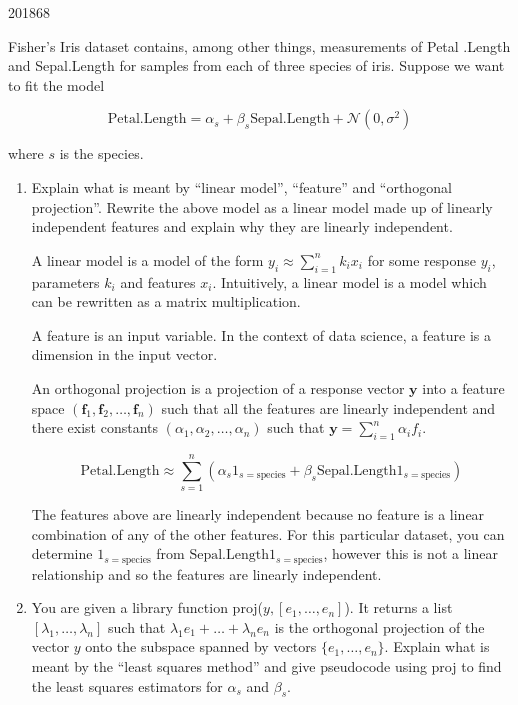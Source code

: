 \documentclass[10pt,\jkfside,a4paper]{article}
\begin{document}
\begin{examquestion}{2018}{6}{8}

Fisher's Iris dataset contains, among other things, measurements of Petal
.Length and Sepal.Length for samples from each of three species of iris.
Suppose we want to fit the model

\[
\text{Petal.Length} = \alpha_s + \beta_s \text{Sepal.Length} + \mathcal{N}
(0, \sigma^2)
\]

where $s$ is the species.

\begin{enumerate}[label=(\alph*)]

\item Explain what is meant by ``linear model'', ``feature'' and
``orthogonal projection''. Rewrite the above model as a linear model made up
of linearly independent features and explain why they are linearly
independent.

A linear model is a model of the form $y_i \approx \sum^{n}_{i=1} k_i x_i $
for some response $y_i$, parameters $k_i$ and features $x_i$. Intuitively, a
linear model is a model which can be rewritten as a matrix multiplication.

A feature is an input variable. In the context of data science, a feature is
a dimension in the input vector.

An orthogonal projection is a projection of a response vector $\mathbf{y}$
into a feature space $(\mathbf{f}_1, \mathbf{f}_2, \dots, \mathbf{f}_n)$
such that all the features are linearly independent and there exist
constants $(\alpha_1, \alpha_2, \dots, \alpha_n)$ such that $\mathbf{y} =
\sum^n_{i=1} \alpha_i f_i$.

\[
\text{Petal.Length} \approx \sum^n_{s=1} \left(\alpha_s 1_{s=\text{species}} +
\beta_s
\text{Sepal.Length} 1_{s=\text{species}}\right)
\]

The features above are linearly independent because no feature is a linear
combination of any of the other features. For this particular dataset, you
can determine $1_{s=\text{species}}$ from $\text{Sepal.Length}
1_{s=\text{species}}$, however this is not a linear relationship and so the
features are linearly independent.

\item You are given a library function proj($y, [e_1, \dots, e_n]$). It
returns a list $[\lambda_1, \dots, \lambda_n]$ such that $\lambda_1 e_1 +
\dots + \lambda_n e_n$ is the orthogonal projection of the vector $y$ onto
the subspace spanned by vectors $\{e_1, \dots, e_n\}$. Explain what is meant
by the ``least squares method'' and give pseudocode using proj to find the
least squares estimators for $\alpha_s$ and $\beta_s$.


\end{enumerate}
\end{examquestion}
\end{document}
